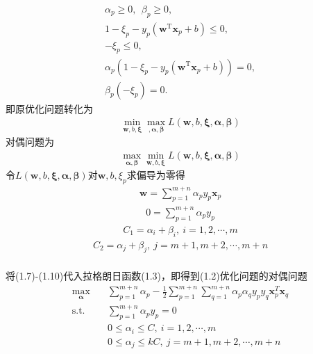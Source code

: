 \documentclass{article}
\begin{document}
\begin{equation}
    	\label{eq-svm-la}
    	\begin{split}
    	\alpha_p\geq 0,\ \ \beta_p\geq 0,\\
		1-\xi_p-y_p(\mathbf{w}^\mathrm{T}\mathbf{x}_p + b)\leq 0,\\
		-\xi_p\leq 0,\\
		\alpha_p(1-\xi_p-y_p(\mathbf{w}^\mathrm{T}\mathbf{x}_p + b))=0,\\
		\beta_p(-\xi_p)=0.
    	\end{split}
    \end{equation}
即原优化问题转化为
\begin{equation}
    	\begin{split}
			\min_{\bm{w},b,\bm{\xi}}\max_{,\bm{\alpha},\bm{\beta}}L(\bm{w},b,\bm{\xi},\bm{\alpha},\bm{\beta})
    	\end{split}
\end{equation}
对偶问题为
\begin{equation}
    	\begin{split}
			\max_{\bm{\alpha},\bm{\beta}}\min_{\bm{w},b,\bm{\xi}}L(\bm{w},b,\bm{\xi},\bm{\alpha},\bm{\beta})
    	\end{split}
\end{equation}
令$L(\bm{w},b,\bm{\xi},\bm{\alpha},\bm{\beta})$对$\bm{w},b,\xi_p$求偏导为零得
\begin{equation}
    	\begin{split}
			\bm{w}=\sum_{p=1}^{m+n}\alpha_py_p\bm{x}_p
    	\end{split}
\end{equation}
\begin{equation}
    	\begin{split}
			0=\sum_{p=1}^{m+n}\alpha_py_p
    	\end{split}
\end{equation}
\begin{equation}
    	\begin{split}
			C_1=\alpha_i+\beta_i,\ i=1,2,\cdots,m
    	\end{split}
\end{equation}
\begin{equation}
    	\begin{split}
			C_2=\alpha_j+\beta_j,\ j=m+1,m+2,\cdots,m+n
    	\end{split}
\end{equation}
\\将(1.7)-(1.10)代入拉格朗日函数(1.3)，即得到(1.2)优化问题的对偶问题
\begin{equation}
    	\begin{split}
			\max_{\bm{\alpha}}& \quad \sum_{p=1}^{m+n}\alpha_p-\frac{1}{2}\sum_{p=1}^{m+n}\sum_{q=1}^{m+n}\alpha_p\alpha_qy_py_q\bm{x}_p^T\bm{x}_q\\
\text{s.t.}& \quad \sum_{p=1}^{m+n}\alpha_py_p=0\\
    		& \quad 0\leq\alpha_i\leq C,\ i=1,2,\cdots,m\\
			& \quad 0\leq\alpha_j\leq kC, \ j=m+1,m+2,\cdots,m+n\\
    	\end{split}
\end{equation}
	\newpage
\end{document}
